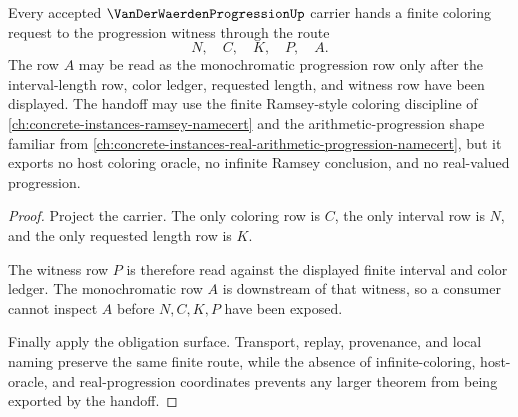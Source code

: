\begin{theorem}
\label{thm:van-der-waerden-progression-coloring-handoff}
Every accepted $\VanDerWaerdenProgressionUp$ carrier hands a finite coloring request to the progression witness through the route
$$
N,\quad C,\quad K,\quad P,\quad A .
$$
The row $A$ may be read as the monochromatic progression row only after the interval-length row, color ledger, requested length, and witness row have been displayed. The handoff may use the finite Ramsey-style coloring discipline of \autoref{ch:concrete-instances-ramsey-namecert} and the arithmetic-progression shape familiar from \autoref{ch:concrete-instances-real-arithmetic-progression-namecert}, but it exports no host coloring oracle, no infinite Ramsey conclusion, and no real-valued progression.
\end{theorem}
\begin{proof}
Project the carrier. The only coloring row is $C$, the only interval row is $N$, and the only requested length row is $K$.

The witness row $P$ is therefore read against the displayed finite interval and color ledger. The monochromatic row $A$ is downstream of that witness, so a consumer cannot inspect $A$ before $N,C,K,P$ have been exposed.

Finally apply the obligation surface. Transport, replay, provenance, and local naming preserve the same finite route, while the absence of infinite-coloring, host-oracle, and real-progression coordinates prevents any larger theorem from being exported by the handoff.
\end{proof}




